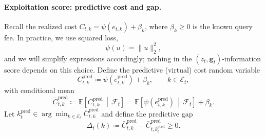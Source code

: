 \paragraph{Exploitation score: predictive cost and gap.}
Recall the realized cost \(C_{t,k}=\psi(e_{t,k})+\beta_k\), where \(\beta_k\ge 0\) is the known query
fee.
In practice, we use squared loss,
\begin{equation}
\label{eq:exp_squared_loss}
\psi(u)=\lVert u\rVert_2^2,
\end{equation}
and we will simplify expressions accordingly; nothing in the \((z_t,\mathbf{g}_t)\)-information score
depends on this choice.
Define the predictive (virtual) cost random variable
\begin{equation}
\label{eq:exp_virtual_cost}
C_{t,k}^{\mathrm{pred}}
\coloneqq
\psi(e_{t,k}^{\mathrm{pred}})+\beta_k,
\qquad k\in\mathcal{E}_t,
\end{equation}
with conditional mean
\begin{equation}
\label{eq:exp_mean_cost}
\bar C_{t,k}^{\mathrm{pred}}\coloneqq \mathbb{E}\!\left[C_{t,k}^{\mathrm{pred}}\,\middle|\,\mathcal{F}_t\right]
=
\mathbb{E}\!\left[\psi(e_{t,k}^{\mathrm{pred}})\,\middle|\,\mathcal{F}_t\right]+\beta_k.
\end{equation}
Let \(k_t^{\mathrm{pred}}\in\arg\min_{k\in\mathcal{E}_t}\bar C_{t,k}^{\mathrm{pred}}\) and define the predictive gap
\begin{equation}
\label{eq:exp_gap}
\Delta_t(k)\coloneqq \bar C_{t,k}^{\mathrm{pred}}-\bar C_{t,k_t^{\mathrm{pred}}}^{\mathrm{pred}}\ge 0.
\end{equation}

